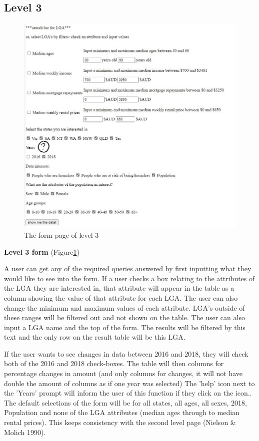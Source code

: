 \documentclass[12pt, a4paper]{article}
\begin{document}
\subsection{Level 3}
\begin{figure}[h]
\centering
\includegraphics[scale=.9]{level3form.jpeg} 
\caption{The form page of level 3}
\label{fig:3form}
\end{figure}
\textbf{Level 3 form} (Figure\ref{fig:3form})

A user can get any of the required queries answered by first inputting what they would like to see into the form. If a user checks a box relating to the attributes of the LGA they are interested in, that attribute will appear in the table as a column showing the value of that attribute for each LGA. The user can also change the minimum and maximum values of each attribute. LGA's outside of these ranges will be filtered out and not shown on the table. The user can also input a LGA name and the top of the form. The results will be filtered by this text and the only row on the result table will be this LGA. 

If the user wants to see changes in data between 2016 and 2018, they will check both of the 2016 and 2018 check-boxes.  The table will then columns for percentage changes in amount (and only columns for changes, it will not have double the amount of columns as if one year was selected) The 'help' icon next to the 'Years' prompt will inform the user of this function if they click on the icon..
The default selections of the form will be for all states, all ages, all sexes, 2018, Population and none of the LGA attributes (median ages through to median rental prices). This keeps consistency with the second level page (Nielson \& Molich 1990).
 
\end{document}
